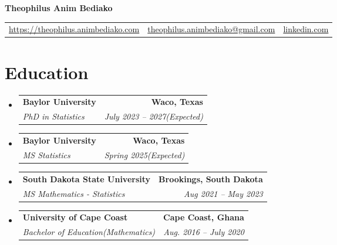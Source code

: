 \documentclass[letterpaper,11pt]{article}
\makeatletter
\newcommand{\resumeSubheadingnobullet}[4]{
	\vspace{-1pt}\item[]
	\begin{tabular*}{0.97\textwidth}[t]{l@{\extracolsep{\fill}}r}
		\textbf{#1} & \textbf{#2} \\
		\textit{\small#3} & \textit{\small #4} \\
	\end{tabular*}\vspace{-5pt}
}
\newcommand{\resumeSubHeadingListStart}{\begin{itemize}[leftmargin=0pt]}
\newcommand{\resumeSubHeadingListEnd}{\end{itemize}}
\makeatother
\begin{document}
\begin{center}
	\textbf{\huge Theophilus Anim Bediako}\\
	\begin{tabular}{c c c}
			\faGlobe\enspace\href{https://theoanim.github.io/}{https://theophilus.animbediako.com}\quad \textbar%
			&\; \faEnvelopeO\enspace \href{mailto:theophilus.animbediako@gmail.com}{theophilus.animbediako@gmail.com} \quad
			&\textbar \quad \faLinkedinSquare\;  \href{https://www.linkedin.com/in/theophilus-anim-bediako-172093206/}{{linkedin.com}}\\
	\end{tabular}
\end{center}


  
\section{Education}
\resumeSubHeadingListStart
\resumeSubheadingnobullet
{Baylor University}{Waco, Texas}
{PhD in Statistics}{July 2023 -- 2027(Expected)}\vspace{-.1cm}
\resumeSubheadingnobullet
{Baylor University}{Waco, Texas}
{MS Statistics}{Spring 2025(Expected)}\vspace{-.1cm}
\resumeSubheadingnobullet
{South Dakota State University}{Brookings, South Dakota}
{MS Mathematics - Statistics}{Aug 2021 -- May 2023}\vspace{-.1cm}
\resumeSubheadingnobullet
{University of Cape Coast}{Cape Coast, Ghana}
{Bachelor of Education(Mathematics)}{Aug. 2016 -- July 2020}\vspace{-.1cm}
\resumeSubHeadingListEnd

\end{document}
